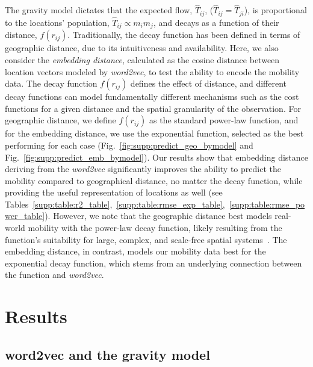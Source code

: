 \documentclass[12pt]{article} %
\begin{document}
The gravity model dictates that the expected flow, $\hat{T}_{ij}$, ($\hat{T}_{ij }= \hat{T}_{ji}$), is proportional to the locations' population, $\hat{T}_{ij} \propto m_{i} m_{j}$, and decays as a function of their distance, $f(r_{ij})$.
Traditionally, the decay function has been defined in terms of geographic distance, due to its intuitiveness and availability.
Here, we also consider the \textit{embedding distance}, calculated as the cosine distance between location vectors modeled by \textit{word2vec}, to test the ability to encode the mobility data.
The decay function $f(r_{ij})$ defines the effect of distance, and different decay functions can model fundamentally different mechanisms \autocite{barthelemy2011spatial} such as the cost functions for a given distance and the spatial granularity of the observation.
For geographic distance, we define $f(r_{ij})$ as the standard power-law function, and for the embedding distance, we use the exponential function, selected as the best performing for each case (Fig.~\ref{fig:supp:predict_geo_bymodel} and Fig.~\ref{fig:supp:predict_emb_bymodel}).
Our results show that embedding distance deriving from the \textit{word2vec} significantly improves the ability to predict the mobility compared to geographical distance, no matter the decay function, while providing the useful representation of locations as well (see Tables~\ref{supp:table:r2_table},~\ref{supp:table:rmse_exp_table},~\ref{supp:table:rmse_power_table}).
However, we note that the geographic distance best models real-world mobility with the power-law decay function, likely resulting from the function's suitability for large, complex, and scale-free spatial systems~\autocite{chen2015distance}.
The embedding distance, in contrast, models our mobility data best for the exponential decay function, which stems from an underlying connection between the function and \textit{word2vec}.

\section*{Results}
%
\subsection*{word2vec and the gravity model}
\end{document}
